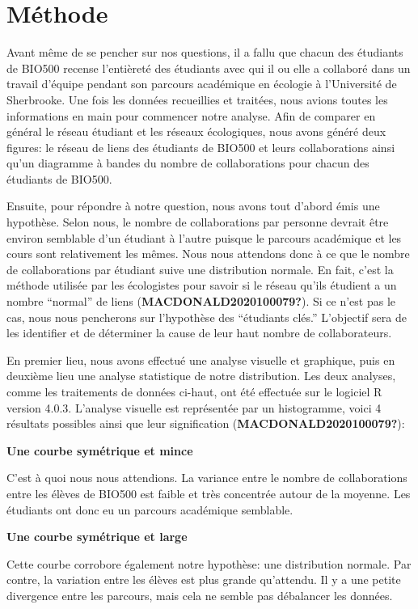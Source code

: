 \documentclass[9pt,twocolumn,twoside,]{pnas-new}
\begin{document}
\hypertarget{muxe9thode}{%
\section{Méthode}\label{muxe9thode}}

Avant même de se pencher sur nos questions, il a fallu que chacun des
étudiants de BIO500 recense l'entièreté des étudiants avec qui il ou
elle a collaboré dans un travail d'équipe pendant son parcours
académique en écologie à l'Université de Sherbrooke. Une fois les
données recueillies et traitées, nous avions toutes les informations en
main pour commencer notre analyse. Afin de comparer en général le réseau
étudiant et les réseaux écologiques, nous avons généré deux figures: le
réseau de liens des étudiants de BIO500 et leurs collaborations ainsi
qu'un diagramme à bandes du nombre de collaborations pour chacun des
étudiants de BIO500.

Ensuite, pour répondre à notre question, nous avons tout d'abord émis
une hypothèse. Selon nous, le nombre de collaborations par personne
devrait être environ semblable d'un étudiant à l'autre puisque le
parcours académique et les cours sont relativement les mêmes. Nous nous
attendons donc à ce que le nombre de collaborations par étudiant suive
une distribution normale. En fait, c'est la méthode utilisée par les
écologistes pour savoir si le réseau qu'ils étudient a un nombre
``normal'' de liens (\textbf{MACDONALD2020100079?}). Si ce n'est pas le
cas, nous nous pencherons sur l'hypothèse des ``étudiants clés.''
L'objectif sera de les identifier et de déterminer la cause de leur haut
nombre de collaborateurs.

En premier lieu, nous avons effectué une analyse visuelle et graphique,
puis en deuxième lieu une analyse statistique de notre distribution. Les
deux analyses, comme les traitements de données ci-haut, ont été
effectuée sur le logiciel R version 4.0.3. L'analyse visuelle est
représentée par un histogramme, voici 4 résultats possibles ainsi que
leur signification (\textbf{MACDONALD2020100079?}):

\textbf{Une courbe symétrique et mince}

C'est à quoi nous nous attendions. La variance entre le nombre de
collaborations entre les élèves de BIO500 est faible et très concentrée
autour de la moyenne. Les étudiants ont donc eu un parcours académique
semblable.

\textbf{Une courbe symétrique et large}

Cette courbe corrobore également notre hypothèse: une distribution
normale. Par contre, la variation entre les élèves est plus grande
qu'attendu. Il y a une petite divergence entre les parcours, mais cela
ne semble pas débalancer les données.
\end{document}
